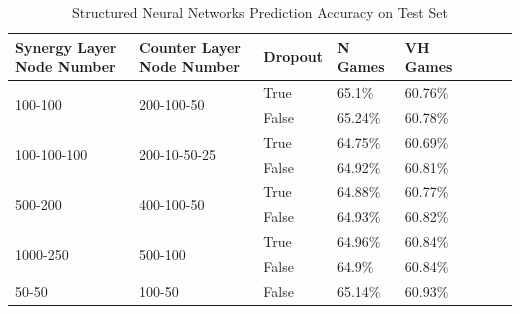 \documentclass{article}
\begin{document}
\begin{appendix}
\bgroup
\def\arraystretch{1.7}%
{
\begin{table}[htb]
\centering
\begin{tabularx}{\textwidth}{ |X|l|l|l|l|l|l|l| } 
\hline
\textbf{Synergy Layer Node Number}    & \textbf{Counter Layer Node Number}     & \textbf{Dropout} & \textbf{N Games} & \textbf{VH
Games} \\ \hline
\multirow{2}{*}{100-100}     & \multirow{2}{*}{200-100-50}   & True    & 65.1\%                                            & 60.76\%                                            \\ \cline{3-5} 
                             &                               & False   & 65.24\%                                           & 60.78\%                                            \\ \hline
\multirow{2}{*}{100-100-100} & \multirow{2}{*}{200-10-50-25} & True    & 64.75\%                                           & 60.69\%                                            \\ \cline{3-5} 
                             &                               & False   & 64.92\%                                           & 60.81\%                                            \\ \hline
\multirow{2}{*}{500-200}     & \multirow{2}{*}{400-100-50}   & True    & 64.88\%                                           & 60.77\%                                            \\ \cline{3-5} 
                             &                               & False   & 64.93\%                                           & 60.82\%                                            \\ \hline
\multirow{2}{*}{1000-250}    & \multirow{2}{*}{500-100}      & True    & 64.96\%                                           & 60.84\%                                            \\ \cline{3-5} 
                             &                               & False   & 64.9\%                                            & 60.84\%                                            \\ \hline
50-50                        & 100-50                        & False   & 65.14\%                                           & 60.93\%                                            \\ \hline
\end{tabularx}
\caption{Structured Neural Networks Prediction Accuracy on Test Set}
\label{table:FC_Synergy_Counter}
\end{table}}
\egroup


\end{appendix}
\end{document}
